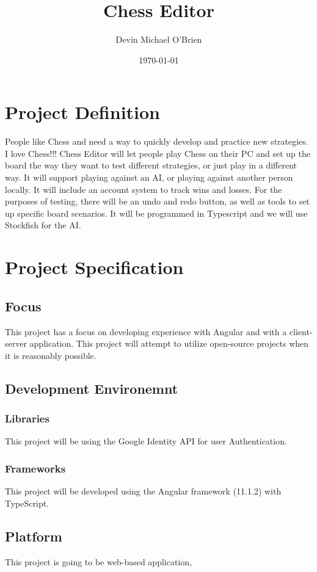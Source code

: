\documentclass[11pt]{article}
\author{Devin Michael O'Brien}
\date{\today}
\title{Chess Editor}
\begin{document}
\maketitle
\tableofcontents

\section{Project Definition}
\label{sec:org61485d5}
People like Chess and need a way to quickly develop and practice new strategies. I love
Chess!!! Chess Editor will let people play Chess on their PC and set up the board the
way they want to test different strategies, or just play in a different way. It will support
playing against an AI, or playing against another person locally. It will include an account
system to track wins and losses. For the purposes of testing, there will be an undo and
redo button, as well as tools to set up specific board scenarios. It will be programmed in
Typescript and we will use Stockfish for the AI.
\section{Project Specification}
\label{sec:org9f7263e}
\subsection{Focus}
\label{sec:org6b55886}
This project has a focus on developing experience with Angular and
with a client-server application. This project will attempt to utilize
open-source projects when it is reasonably possible.

\subsection{Development Environemnt}
\label{sec:orgcc8f8a6}
\subsubsection{Libraries}
\label{sec:orge64ef45}
This project will be using the Google Identity API for user Authentication.
\subsubsection{Frameworks}
\label{sec:orgd6c9225}
This project will be developed using the Angular framework (11.1.2)
with TypeScript.
\subsection{Platform}
\label{sec:org9cfeb7e}
This project is going to be web-based application,
\end{document}
